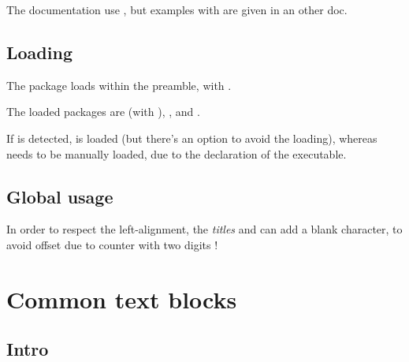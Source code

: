\documentclass[english,11pt,a4paper]{article}
\begin{document}
The documentation use , but examples with  are given in an other doc.

\subsection{Loading}

The package loads within the preamble, with .

The loaded packages are  (with ), ,  and .

If  is detected,  is loaded (but there's an option to avoid the loading), whereas  needs to be manually loaded, due to the declaration of the executable.

\begin{codehigh}[language=latex/latex2,style/main=cyan!10,style/code=cyan!10]
\usepackage{pynotebook}
\end{codehigh}

\begin{codehigh}[language=latex/latex2,style/main=cyan!10,style/code=cyan!10]
\usepackage{pynotebook}
\usepackage[options]{pyluatex}
\end{codehigh}

\begin{codehigh}[language=latex/latex2,style/main=cyan!10,style/code=cyan!10]
\usepackage[nopiton]{pynotebook}
\end{codehigh}

\subsection{Global usage}

In order to respect the left-alignment, the \textit{titles}  and  can add a blank character, to avoid offset due to counter with two digits !

\pagebreak

\section{Common text blocks}

\subsection{Intro}
\end{document}
